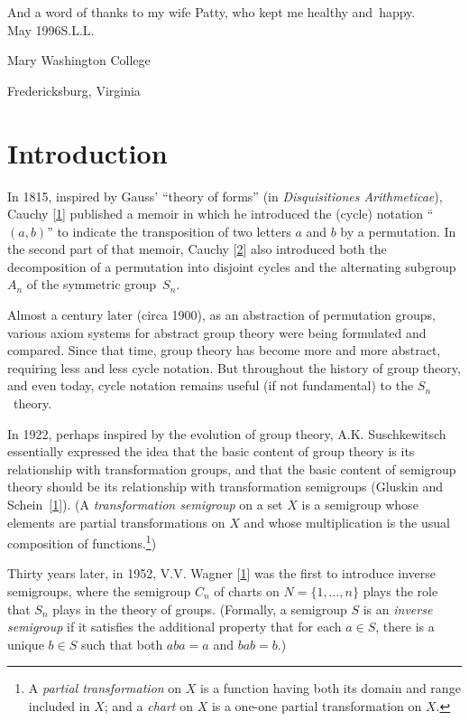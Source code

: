 \documentclass{surv-l}
\numberwithin{equation}{section}
\numberwithin{table}{section}
\numberwithin{figure}{section}
\theoremstyle{definition}
\begin{document}
And a word of thanks to my wife Patty, who kept me healthy
and~happy.\\

\noindent May 1996\hfill S.L.L.

\noindent Mary Washington College

\noindent Fredericksburg, Virginia

\chapter*{Introduction}

In 1815, inspired by Gauss' ``theory of forms'' (in
\emph{Disquisitiones Arithmeticae}), Cauchy
[\hyperlink{bib7}{1}] published a memoir in which he
introduced the (cycle) notation ``$(a,b)$'' to indicate the
transposition of two letters $a$ and $b$ by a permutation. In the
second part of that memoir, Cauchy [\hyperlink{bib7a}{2}]
also introduced both the decomposition of a permutation into
disjoint cycles and the alternating subgroup $A_{n}$ of the symmetric
group~$S_{n}$.

Almost a century later (circa 1900), as an abstraction of
permutation groups, various axiom systems for abstract group
theory were being formulated and compared. Since that time, group
theory has become more and more abstract, requiring less and less
cycle notation. But throughout the history of group theory, and
even today, cycle notation remains useful (if not fundamental) to
the $S_{n}$~theory.

\setcounter{footnote}{0}

In 1922, perhaps inspired by the evolution of group theory, A.K.
Suschkewitsch essentially expressed the idea that the basic
content of group theory is its relationship with transformation
groups, and that the basic content of semigroup theory should be
its relationship with transformation
semigroups
(Gluskin and Schein~[\hyperlink{bib20}{1}]). (A \emph{transformation
semigroup} on a set $X$ is a semigroup whose
elements are partial transformations on $X$ and whose
multiplication is the usual composition of functions.\footnote{A
\emph{partial transformation} on $X$
is a function having both its domain and range included in $X$;
and a \emph{chart} on $X$ is a one-one partial
transformation on $X$.})

Thirty years later, in 1952, V.V. Wagner
[\hyperlink{bib78}{1}] was the first to introduce inverse
semigroups, where the semigroup $C_{n}$ of charts on
$N=\{1,\ldots, n\}$ plays the role that $S_{n}$ plays in the
theory of groups. (Formally, a semigroup $S$ is an \emph{inverse
semigroup} if it satisfies the additional
property that for each $a\in S$, there is a unique $b\in S$ such
that both $aba=a$ and $bab=b.$)
\end{document}
